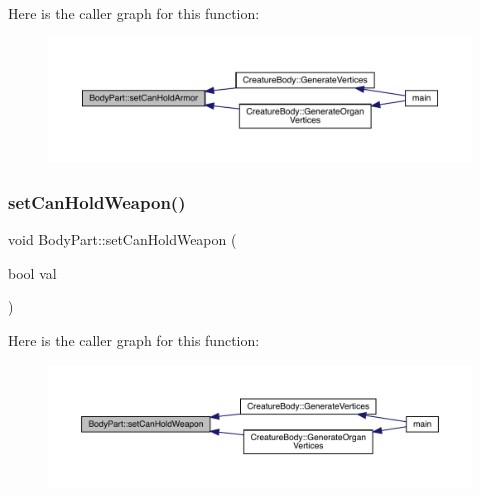 Here is the caller graph for this function\+:
\nopagebreak
\begin{figure}[H]
\begin{center}
\leavevmode
\includegraphics[width=350pt]{class_body_part_ad83118e7510cbab332815cd9254a6024_icgraph}
\end{center}
\end{figure}
\mbox{\label{class_body_part_af61f39aa545dacd8c1a9cf43761df85a}} 
\subsubsection{\texorpdfstring{set\+Can\+Hold\+Weapon()}{setCanHoldWeapon()}}
{\footnotesize\ttfamily void Body\+Part\+::set\+Can\+Hold\+Weapon (\begin{DoxyParamCaption}\item[{bool}]{val }\end{DoxyParamCaption})}

Here is the caller graph for this function\+:
\nopagebreak
\begin{figure}[H]
\begin{center}
\leavevmode
\includegraphics[width=350pt]{class_body_part_af61f39aa545dacd8c1a9cf43761df85a_icgraph}
\end{center}
\end{figure}
\mbox{\label{class_body_part_acb68020a45ea6f0d14b963b3159317a2}} 
